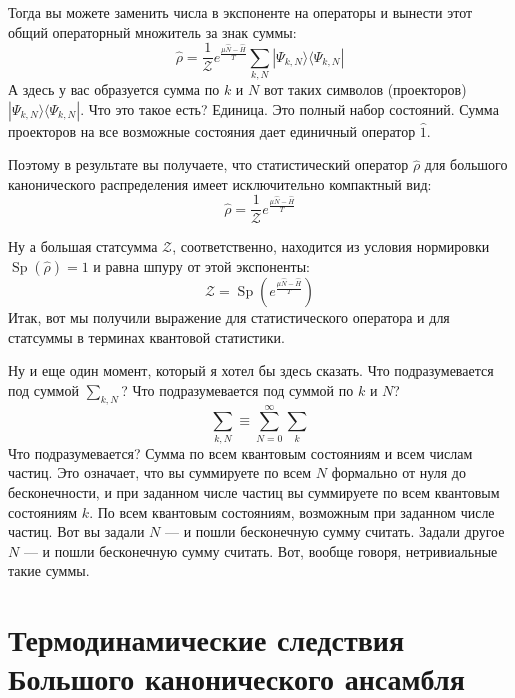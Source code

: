 \documentclass[../general/general]{subfiles}
\begin{document}
Тогда вы можете заменить числа в экспоненте на операторы и вынести этот общий операторный множитель за знак суммы:
\begin{equation*}
    \hat{\rho} = \frac{1}{\mathcal{Z}} e^{\frac{\mu \hat{N} - \hat{H}}{T}} \sum_{k, N} |\Psi_{k, N}\rangle \langle \Psi_{k, N}|
\end{equation*}
А здесь у вас образуется сумма по $k$ и $N$ вот таких символов (проекторов) $|\Psi_{k, N}\rangle \langle \Psi_{k, N}|$. Что это такое есть? Единица. Это полный набор состояний. Сумма проекторов на все возможные состояния дает единичный оператор $\hat{1}$. 

Поэтому в результате вы получаете, что статистический оператор $\hat{\rho}$ для большого канонического распределения имеет исключительно компактный вид:
\begin{equation}
    \hat{\rho} = \frac{1}{\mathcal{Z}} e^{\frac{\mu \hat{N} - \hat{H}}{T}}
\end{equation}

Ну а большая статсумма $\mathcal{Z}$, соответственно, находится из условия нормировки $\operatorname{Sp}(\hat{\rho}) = 1$ и равна шпуру от этой экспоненты:
\begin{equation}
    \mathcal{Z} = \operatorname{Sp} \left( e^{\frac{\mu \hat{N} - \hat{H}}{T}} \right)
\end{equation}
Итак, вот мы получили выражение для статистического оператора и для статсуммы в терминах квантовой статистики.

Ну и еще один момент, который я хотел бы здесь сказать. Что подразумевается под суммой $\sum_{k, N}$? Что подразумевается под суммой по $k$ и $N$?
\begin{equation*}
    \sum_{k, N} \equiv \sum_{N=0}^{\infty} \sum_k
\end{equation*}
Что подразумевается? Сумма по всем квантовым состояниям и всем числам частиц. Это означает, что вы суммируете по всем $N$ формально от нуля до бесконечности, и при заданном числе частиц вы суммируете по всем квантовым состояниям $k$. По всем квантовым состояниям, возможным при заданном числе частиц. Вот вы задали $N$ — и пошли бесконечную сумму считать. Задали другое $N$ — и пошли бесконечную сумму считать. Вот, вообще говоря, нетривиальные такие суммы.




\section{Термодинамические следствия Большого канонического ансамбля}
\end{document}
